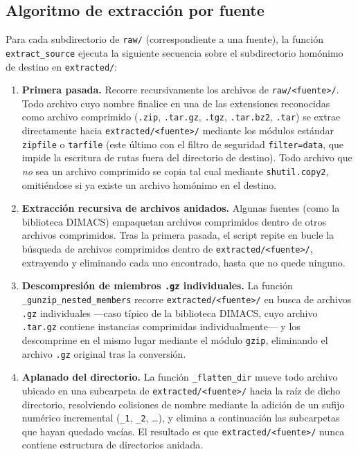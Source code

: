 \subsection{Algoritmo de extracci\'on por fuente}

Para cada subdirectorio de \texttt{raw/} (correspondiente a una fuente), la
funci\'on \texttt{extract\_source} ejecuta la siguiente secuencia sobre el
subdirectorio hom\'onimo de destino en \texttt{extracted/}:

\begin{enumerate}
    \item \textbf{Primera pasada.} Recorre recursivamente los archivos de
    \texttt{raw/<fuente>/}. Todo archivo cuyo nombre finalice en una de las
    extensiones reconocidas como archivo comprimido
    (\texttt{.zip}, \texttt{.tar.gz}, \texttt{.tgz}, \texttt{.tar.bz2},
    \texttt{.tar}) se extrae directamente hacia
    \texttt{extracted/<fuente>/} mediante los m\'odulos est\'andar
    \texttt{zipfile} o \texttt{tarfile} (este \'ultimo con el filtro de
    seguridad \texttt{filter=\textquotedbl data\textquotedbl}, que impide la escritura de rutas
    fuera del directorio de destino). Todo archivo que \emph{no} sea un
    archivo comprimido se copia tal cual mediante \texttt{shutil.copy2},
    omiti\'endose si ya existe un archivo hom\'onimo en el destino.
    \item \textbf{Extracci\'on recursiva de archivos anidados.} Algunas
    fuentes (como la biblioteca DIMACS) empaquetan archivos comprimidos
    dentro de otros archivos comprimidos. Tras la primera pasada, el
    script repite en bucle la b\'usqueda de archivos comprimidos dentro de
    \texttt{extracted/<fuente>/}, extrayendo y eliminando cada uno
    encontrado, hasta que no quede ninguno.
    \item \textbf{Descompresi\'on de miembros \texttt{.gz} individuales.}
    La funci\'on \texttt{\_gunzip\_nested\_members} recorre
    \texttt{extracted/<fuente>/} en busca de archivos \texttt{.gz}
    individuales —caso t\'ipico de la biblioteca DIMACS, cuyo archivo
    \texttt{.tar.gz} contiene instancias comprimidas individualmente— y los
    descomprime en el mismo lugar mediante el m\'odulo \texttt{gzip},
    eliminando el archivo \texttt{.gz} original tras la conversi\'on.
    \item \textbf{Aplanado del directorio.} La funci\'on
    \texttt{\_flatten\_dir} mueve todo archivo ubicado en una subcarpeta de
    \texttt{extracted/<fuente>/} hacia la ra\'iz de dicho directorio,
    resolviendo colisiones de nombre mediante la adici\'on de un sufijo
    num\'erico incremental (\texttt{\_1}, \texttt{\_2}, \ldots), y elimina
    a continuaci\'on las subcarpetas que hayan quedado vac\'ias. El
    resultado es que \texttt{extracted/<fuente>/} nunca contiene
    estructura de directorios anidada.
\end{enumerate}

